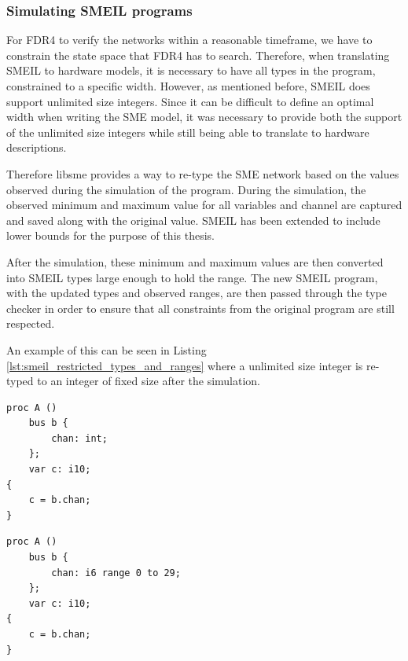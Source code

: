 \subsubsection{Simulating SMEIL programs}
For FDR4 to verify the networks within a reasonable timeframe, we have to constrain the state space that FDR4 has to search. Therefore, when translating SMEIL to hardware models, it is necessary to have all types in the program, constrained to a specific width. However, as mentioned before, SMEIL does support unlimited size integers. Since it can be difficult to define an optimal width when writing the SME model, it was necessary to provide both the support of the unlimited size integers while still being able to translate to hardware descriptions.

Therefore libsme provides a way to re-type the SME network based on the values observed during the simulation of the program.
During the simulation, the observed minimum and maximum value for all variables and channel are captured and saved along with the original value. SMEIL has been extended to include lower bounds for the purpose of this thesis.

After the simulation, these minimum and maximum values are then converted into SMEIL types large enough to hold the range.
The new SMEIL program, with the updated types and observed ranges, are then passed through the type checker in order to ensure that all constraints from the original program are still respected.

An example of this can be seen in Listing \ref{lst:smeil_restricted_types_and_ranges} where a unlimited size integer is re-typed to an integer of fixed size after the simulation.\\
\begin{minipage}[t]{.98\linewidth}
  \begin{minipage}[t]{0.45\linewidth}
    \begin{verbatim}
proc A ()
    bus b {
        chan: int;
    };
    var c: i10;
{
    c = b.chan;
}
    \end{verbatim}
    \label{lst:unconstrained_smeil_type}
  \end{minipage}
  \hspace{0.5cm}
  \begin{minipage}[t]{0.45\linewidth}
    \begin{verbatim}
proc A ()
    bus b {
        chan: i6 range 0 to 29;
    };
    var c: i10;
{
    c = b.chan;
}
    \end{verbatim}
    \label{lst:constrained_smeil_type}
  \end{minipage}
    \vspace{0.5cm}
   \label{lst:smeil_restricted_types_and_rangesg}
   \vspace{1cm}
\end{minipage}
